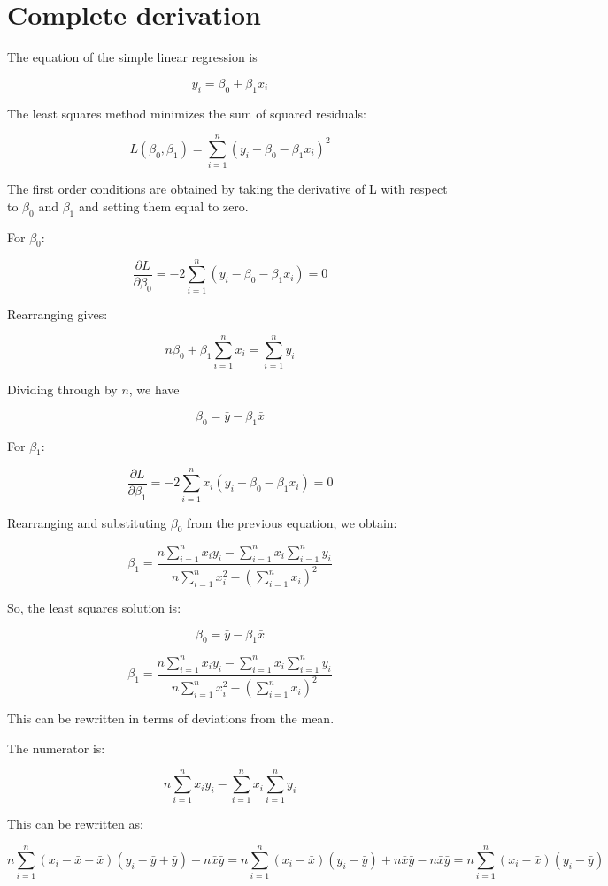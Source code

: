 \documentclass[12pt,a4paper, brazil]{article}
\begin{document}
\section{Complete derivation}

The equation of the simple linear regression is

$$
y_i = \beta_0 + \beta_1 x_i 
$$


The least squares method minimizes the sum of squared residuals:

$$
L(\beta_0, \beta_1) = \sum_{i=1}^{n} (y_i - \beta_0 - \beta_1 x_i)^2
$$

The first order conditions are obtained by taking the derivative of L with respect to $\beta_0$ and $\beta_1$ and setting them equal to zero. 

For $\beta_0$:

$$
\frac{\partial L}{\partial \beta_0} = -2 \sum_{i=1}^{n} (y_i - \beta_0 - \beta_1 x_i) = 0
$$

Rearranging gives:

$$
n\beta_0 + \beta_1 \sum_{i=1}^{n} x_i = \sum_{i=1}^{n} y_i
$$

Dividing through by $n$, we have

$$
\beta_0 = \bar{y} - \beta_1 \bar{x}
$$

For $\beta_1$:

$$
\frac{\partial L}{\partial \beta_1} = -2 \sum_{i=1}^{n} x_i (y_i - \beta_0 - \beta_1 x_i) = 0
$$


Rearranging and substituting $\beta_0$ from the previous equation, we obtain:

$$
\beta_1 = \frac{n \sum_{i=1}^{n} x_i y_i - \sum_{i=1}^{n} x_i \sum_{i=1}^{n} y_i}{n \sum_{i=1}^{n} x_i^2 - (\sum_{i=1}^{n} x_i)^2}
$$

So, the least squares solution is:

$$
\beta_0 = \bar{y} - \beta_1 \bar{x}
$$

$$
\beta_1 = \frac{n \sum_{i=1}^{n} x_i y_i - \sum_{i=1}^{n} x_i \sum_{i=1}^{n} y_i}{n \sum_{i=1}^{n} x_i^2 - (\sum_{i=1}^{n} x_i)^2}
$$

This can be rewritten in terms of deviations from the mean. 

The numerator is:

\[
n \sum_{i=1}^{n} x_i y_i - \sum_{i=1}^{n} x_i \sum_{i=1}^{n} y_i
\]

This can be rewritten as:

\[
n \sum_{i=1}^{n} (x_i - \bar{x} + \bar{x})(y_i - \bar{y} + \bar{y}) - n \bar{x}\bar{y}
= n \sum_{i=1}^{n} (x_i - \bar{x})(y_i - \bar{y}) + n \bar{x}\bar{y} - n \bar{x}\bar{y}
= n \sum_{i=1}^{n} (x_i - \bar{x})(y_i - \bar{y})
\]
\end{document}
